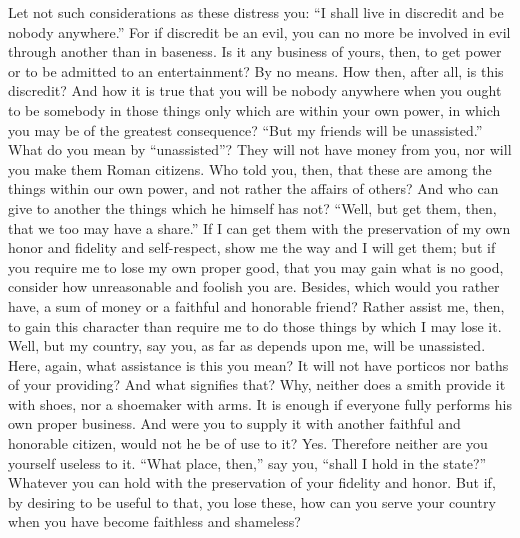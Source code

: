 Let not such considerations as these  distress you: ``I shall live in discredit
and be  nobody anywhere.''  For if  discredit be an  evil, you  can no  more be
involved in evil through another than in baseness. Is it any business of yours,
then, to  get power or  to be  admitted to an  entertainment? By no  means. How
then, after all, is this discredit? And how  it is true that you will be nobody
anywhere when you  ought to be somebody  in those things only  which are within
your own  power, in  which you  may be  of the  greatest consequence?  ``But my
friends will be unassisted.'' What do you mean by ``unassisted''? They will not
have money from you, nor will you make them Roman citizens. Who told you, then,
that  these are  among the  things within  our own  power, and  not rather  the
affairs of others? And who can give  to another the things which he himself has
not? ``Well, but get  them, then, that we too may have a  share.'' If I can get
them with the preservation of my  own honor and fidelity and self-respect, show
me the way  and I will get  them; but if you  require me to lose  my own proper
good, that you may gain what is  no good, consider how unreasonable and foolish
you are. Besides, which would you rather have, a sum of money or a faithful and
honorable friend? Rather  assist me, then, to gain this  character than require
me to do those things by which I may lose it. Well, but my country, say you, as
far as  depends upon me,  will be unassisted.  Here, again, what  assistance is
this you mean? It will not have  porticos nor baths of your providing? And what
signifies  that?  Why, neither  does  a  smith provide  it  with  shoes, nor  a
shoemaker with  arms. It is  enough if everyone  fully performs his  own proper
business.  And were  you  to  supply it  with  another  faithful and  honorable
citizen, would not he be of use  to it? Yes. Therefore neither are you yourself
useless to it.  ``What place, then,'' say  you, ``shall I hold  in the state?''
Whatever you can hold with the preservation of your fidelity and honor. But if,
by  desiring to  be useful  to that,  you lose  these, how  can you  serve your
country when you have become faithless and shameless?

